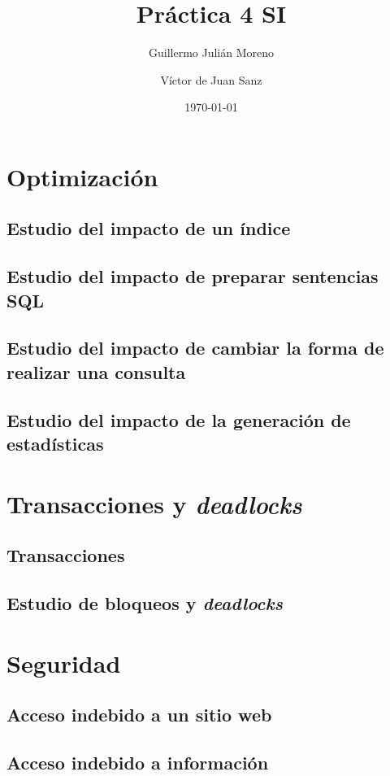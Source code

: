 \documentclass{article}
\title{Práctica 4 SI}
\date{\today}
\author{Guillermo Julián Moreno \and Víctor de Juan Sanz}
\begin{document}
\maketitle

\section{Optimización}

\subsection{Estudio del impacto de un índice}

\subsection{Estudio del impacto de preparar sentencias SQL}

\subsection{Estudio del impacto de cambiar la forma de realizar una consulta}

\subsection{Estudio del impacto de la generación de estadísticas}

\section{Transacciones y \textit{deadlocks}}

\subsection{Transacciones}

\subsection{Estudio de bloqueos y \textit{deadlocks}}

\section{Seguridad}

\subsection{Acceso indebido a un sitio web}

\subsection{Acceso indebido a información}
\end{document}
